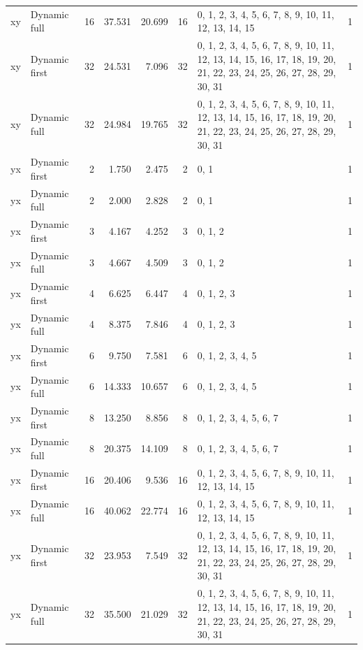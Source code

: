\documentclass[10pt,a4paper]{article}
\begin{document}
\begin{longtable}{@{}p{23mm}p{29mm}rrrrp{36mm}r@{}}
xy & Dynamic full & 16 & 37.531 & 20.699 & 16 & 0, 1, 2, 3, 4, 5, 6, 7, 8, 9, 10, 11, 12, 13, 14, 15 & 1 \\
xy & Dynamic first & 32 & 24.531 & 7.096 & 32 & 0, 1, 2, 3, 4, 5, 6, 7, 8, 9, 10, 11, 12, 13, 14, 15, 16, 17, 18, 19, 20, 21, 22, 23, 24, 25, 26, 27, 28, 29, 30, 31 & 1 \\
xy & Dynamic full & 32 & 24.984 & 19.765 & 32 & 0, 1, 2, 3, 4, 5, 6, 7, 8, 9, 10, 11, 12, 13, 14, 15, 16, 17, 18, 19, 20, 21, 22, 23, 24, 25, 26, 27, 28, 29, 30, 31 & 1 \\
yx & Dynamic first & 2 & 1.750 & 2.475 & 2 & 0, 1 & 1 \\
yx & Dynamic full & 2 & 2.000 & 2.828 & 2 & 0, 1 & 1 \\
yx & Dynamic first & 3 & 4.167 & 4.252 & 3 & 0, 1, 2 & 1 \\
yx & Dynamic full & 3 & 4.667 & 4.509 & 3 & 0, 1, 2 & 1 \\
yx & Dynamic first & 4 & 6.625 & 6.447 & 4 & 0, 1, 2, 3 & 1 \\
yx & Dynamic full & 4 & 8.375 & 7.846 & 4 & 0, 1, 2, 3 & 1 \\
yx & Dynamic first & 6 & 9.750 & 7.581 & 6 & 0, 1, 2, 3, 4, 5 & 1 \\
yx & Dynamic full & 6 & 14.333 & 10.657 & 6 & 0, 1, 2, 3, 4, 5 & 1 \\
yx & Dynamic first & 8 & 13.250 & 8.856 & 8 & 0, 1, 2, 3, 4, 5, 6, 7 & 1 \\
yx & Dynamic full & 8 & 20.375 & 14.109 & 8 & 0, 1, 2, 3, 4, 5, 6, 7 & 1 \\
yx & Dynamic first & 16 & 20.406 & 9.536 & 16 & 0, 1, 2, 3, 4, 5, 6, 7, 8, 9, 10, 11, 12, 13, 14, 15 & 1 \\
yx & Dynamic full & 16 & 40.062 & 22.774 & 16 & 0, 1, 2, 3, 4, 5, 6, 7, 8, 9, 10, 11, 12, 13, 14, 15 & 1 \\
yx & Dynamic first & 32 & 23.953 & 7.549 & 32 & 0, 1, 2, 3, 4, 5, 6, 7, 8, 9, 10, 11, 12, 13, 14, 15, 16, 17, 18, 19, 20, 21, 22, 23, 24, 25, 26, 27, 28, 29, 30, 31 & 1 \\
yx & Dynamic full & 32 & 35.500 & 21.029 & 32 & 0, 1, 2, 3, 4, 5, 6, 7, 8, 9, 10, 11, 12, 13, 14, 15, 16, 17, 18, 19, 20, 21, 22, 23, 24, 25, 26, 27, 28, 29, 30, 31 & 1 \\
\end{longtable}\normalsize\setlength{\tabcolsep}{6pt}
\clearpage
\end{document}

